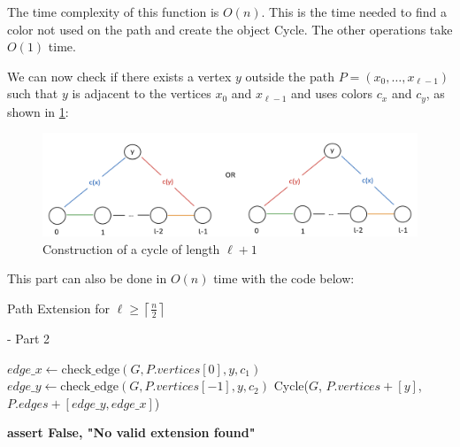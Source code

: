 The time complexity of this function is $O(n)$. This is the time needed
to find a color not used on the path and create the object Cycle. The other
operations take $O(1)$ time.

We can now check if there exists a vertex $y$ outside the path $P = (x_0, \dots, x_{\ell-1})$
such that $y$ is adjacent to the vertices $x_0$ and $x_{\ell-1}$
and uses colors $c_x$ and $c_y$, as shown in \ref{fig:path_vertex_outside}:

\begin{figure}[H]
    \centering
    \includegraphics[width=1\textwidth]{figuras/path_vertex_outside.png}
    \caption{Construction of a cycle of length \( \ell + 1 \)}
    \label{fig:path_vertex_outside}
\end{figure}

This part can also be done in $O(n)$ time with the code below:

\begin{algorithm}[H]
    \caption{Path Extension for \( \ell \geq \left \lceil \frac{n}{2} \right \rceil \)} - Part 2
    \begin{algorithmic}
         
            \For{$[c_1, c_2] \in [[c_x, c_y], [c_y, c_x]]$} 
                        \State $edge\_x \gets \text{check\_edge}(G, P.vertices[0], y, c_1)$
                        \State $edge\_y \gets \text{check\_edge}(G, P.vertices[-1], y, c_2)$
                            \State \Return Cycle($G$, $P.vertices + [y]$, $P.edges + [edge\_y, edge\_x]$) 
                        \EndIf
                    \EndIf
                \EndFor
            \EndFor

            \State \textbf{assert False, "No valid extension found"}
        \EndFunction
    \end{algorithmic}
\end{algorithm}

